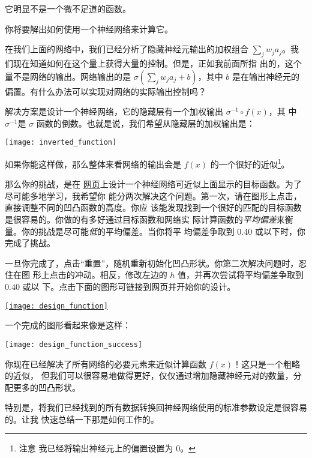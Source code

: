 它明显不是一个微不足道的函数。

你将要解出如何使用一个神经网络来计算它。

在我们上面的网络中，我们已经分析了隐藏神经元输出的加权组合
$\sum_j w_j a_j$。我们现在知道如何在这个量上获得大量的控制。但是，正如我前面所指
出的，这个量不是网络的输出。网络输出的是 $\sigma(\sum_j w_j a_j + b)$，其中 $b$
是在输出神经元的偏置。有什么办法可以实现对网络的实际输出控制吗？

解决方案是设计一个神经网络，它的隐藏层有一个加权输出 $\sigma^{-1} \circ f(x)$，其
中 $\sigma^{-1}$是 $\sigma$ 函数的倒数。也就是说，我们希望从隐藏层的加权输出是：
\begin{center}
  \texttt{[image: inverted\_function]}
\end{center}

如果你能这样做，那么整体来看网络的输出会是 $f(x)$ 的一个很好的近似\footnote{注意
  我已经将输出神经元上的偏置设置为 $0$。}。

那么你的挑战，是在%
\href{http://neuralnetworksanddeeplearning.com/chap4.html#universality_with_one_input_and_one_output}{%
  网页}上设计一个神经网络可近似上面显示的目标函数。为了尽可能多地学习，我希望你
能分两次解决这个问题。第一次，请在图形上点击，直接调整不同的凹凸函数的高度。你应
该能发现找到一个很好的匹配的目标函数是很容易的。你做的有多好通过目标函数和网络实
际计算函数的\emph{平均偏差}来衡量。你的挑战是尽可能\emph{低}的平均偏差。当你将平
均偏差争取到 $0.40$ 或以下时，你完成了挑战。

一旦你完成了，点击“重置”，随机重新初始化凹凸形状。你第二次解决问题时，忍住在图
形上点击的冲动。相反，修改左边的 $h$ 值，并再次尝试将平均偏差争取到 $0.40$ 或以
下。点击下面的图形可链接到网页并开始你的设计。
\begin{center}
  \href{http://neuralnetworksanddeeplearning.com/chap4.html#universality_with_one_input_and_one_output}{\texttt{[image: design\_function]}}
\end{center}

一个完成的图形看起来像是这样：
\begin{center}
  \texttt{[image: design\_function\_success]}
\end{center}

你现在已经解决了所有网络的必要元素来近似计算函数 $f(x)$！这只是一个粗略的近似，
但我们可以很容易地做得更好，仅仅通过增加隐藏神经元对的数量，分配更多的凹凸形状。

特别是，将我们已经找到的所有数据转换回神经网络使用的标准参数设定是很容易的。让我
快速总结一下那是如何工作的。

